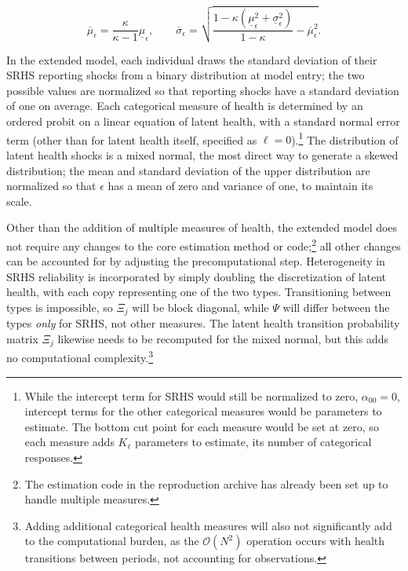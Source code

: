 \documentclass[12pt,pdftex,letterpaper]{article}
\newcommand{\Age}{j}
\newcommand{\LatentParam}{\alpha}
\newcommand{\HealthShock}{\epsilon}
\newcommand{\TransPrb}{\Xi}
\newcommand{\ReportPrb}{\Psi}
\begin{document}
\begin{equation*}
\overline{\mu}_\HealthShock = \frac{\kappa}{\kappa-1} \underline{\mu}_\HealthShock, \qquad \overline{\sigma}_\HealthShock = \sqrt{\frac{1 - \kappa(\underline{\mu}_\HealthShock^2 + \underline{\sigma}_\HealthShock^2)}{1-\kappa} - \overline{\mu}_\HealthShock^2}.
\end{equation*}

In the extended model, each individual draws the standard deviation of their SRHS reporting shocks from a binary distribution at model entry; the two possible values are normalized so that reporting shocks have a standard deviation of one on average.  Each categorical measure of health is determined by an ordered probit on a linear equation of latent health, with a standard normal error term (other than for latent health itself, specified as $\ell=0$).\footnote{While the intercept term for SRHS would still be normalized to zero, $\LatentParam_{00}=0$, intercept terms for the other categorical measures would be parameters to estimate.  The bottom cut point for each measure would be set at zero, so each measure adds $K_\ell$ parameters to estimate, its number of categorical responses.}  The distribution of latent health shocks is a mixed normal, the most direct way to generate a skewed distribution; the mean and standard deviation of the upper distribution are normalized so that $\HealthShock$ has a mean of zero and variance of one, to maintain its scale.

Other than the addition of multiple measures of health, the extended model does not require any changes to the core estimation method or code;\footnote{The estimation code in the reproduction archive has already been set up to handle multiple measures.} all other changes can be accounted for by adjusting the precomputational step.  Heterogeneity in SRHS reliability is incorporated by simply doubling the discretization of latent health, with each copy representing one of the two types.  Transitioning between types is impossible, so $\TransPrb_{\Age}$ will be block diagonal, while $\ReportPrb$ will differ between the types \textit{only} for SRHS, not other measures.  The latent health transition probability matrix $\TransPrb_{\Age}$ likewise needs to be recomputed for the mixed normal, but this adds no computational complexity.\footnote{Adding additional categorical health measures will also not significantly add to the computational burden, as the $\mathcal{O}(N^2)$ operation occurs with health transitions between periods, not accounting for observations.}
\end{document}
